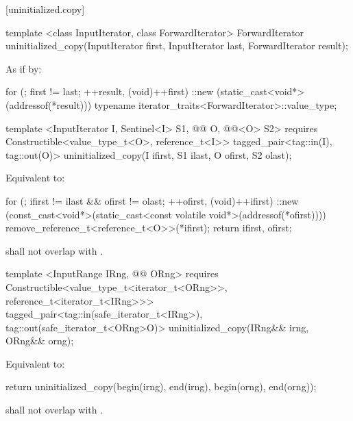 [uninitialized.copy]{}
{\color{remclr}
\begin{codeblock}
template <class InputIterator, class ForwardIterator>
  ForwardIterator uninitialized_copy(InputIterator first, InputIterator last,
                                     ForwardIterator result);
\end{codeblock}

\setcounter{Paras}{0}
\pnum
\effects As if by:
\begin{codeblock}
    for (; first != last; ++result, (void)++first)
      ::new (static_cast<void*>(addressof(*result)))
        typename iterator_traits<ForwardIterator>::value_type;
\end{codeblock}

\setcounter{Paras}{1}
\pnum
\returns {}
} %

{\color{addclr}
\begin{codeblock}
template <InputIterator I, Sentinel<I> S1, @@ O, @@<O> S2>
  requires
Constructible<value_type_t<O>, reference_t<I>>
  tagged_pair<tag::in(I), tag::out(O)>
uninitialized_copy(I ifirst, S1 ilast, O ofirst, S2 olast);
\end{codeblock}

\setcounter{Paras}{0}
\pnum
\effects Equivalent to:
\begin{codeblock}
    for (; ifirst != ilast && ofirst != olast; ++ofirst, (void)++ifirst) {
      ::new (const_cast<void*>(static_cast<const volatile void*>(addressof(*ofirst))))
        remove_reference_t<reference_t<O>>(*ifirst);
    }
    return {ifirst, ofirst};
\end{codeblock}

\pnum
\requires {} shall not overlap with .


\begin{codeblock}
template <InputRange IRng, @@ ORng>
requires
  Constructible<value_type_t<iterator_t<ORng>>, reference_t<iterator_t<IRng>>>
tagged_pair<tag::in(safe_iterator_t<IRng>), tag::out(safe_iterator_t<ORng>O)>
  uninitialized_copy(IRng&& irng, ORng&& orng);
\end{codeblock}

\pnum
\effects Equivalent to:
\begin{codeblock}
    return uninitialized_copy(begin(irng), end(irng), begin(orng), end(orng));
\end{codeblock}

\pnum
\requires {} shall not overlap with .
} %

